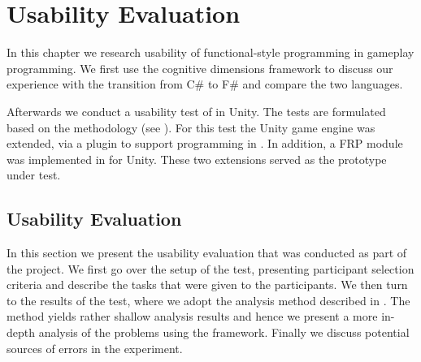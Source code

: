 \chapter{Usability Evaluation}
In this chapter we research usability of functional-style programming in gameplay programming. We first use the cognitive dimensions framework to discuss our experience with the transition from C\# to F\# and compare the two languages.

Afterwards we conduct a usability test of \fs in Unity. The tests are formulated based on the \champagne methodology (see ). For this test the Unity game engine was extended, via a plugin to support programming in \fs\cite{fsharp2019plugin}. In addition, a \gls{FRP} module was implemented in \fs for Unity. These two extensions served as the prototype under test.%



\section{Usability Evaluation}
In this section we present the usability evaluation that was conducted as part of the project. We first go over the setup of the test, presenting participant selection criteria and describe the tasks that were given to the participants. We then turn to the results of the test, where we adopt the analysis method described in \champagne\cite{blackwell2004champagne}. The \champagne method yields rather shallow analysis results and hence we present a more in-depth analysis of the problems using the \cognitive framework. Finally we discuss potential sources of errors in the experiment.




